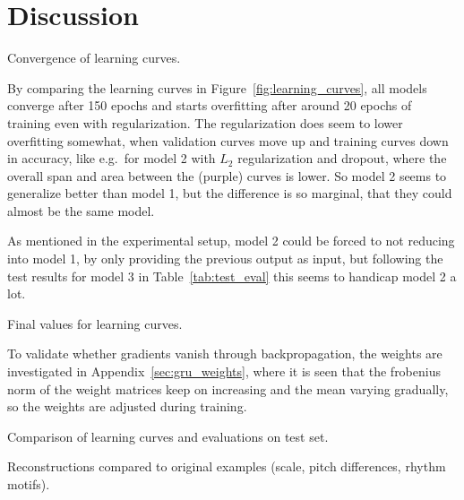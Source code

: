 \section{Discussion}
\label{sec:discussion}

Convergence of learning curves.

By comparing the learning curves in Figure~\ref{fig:learning_curves}, all models converge after 150 epochs and starts overfitting after around 20 epochs of training even with regularization. The regularization does seem to lower overfitting somewhat, when validation curves move up and training curves down in accuracy, like e.g.\ for model 2 with $L_2$ regularization and dropout, where the overall span and area between the (purple) curves is lower. So model 2 seems to generalize better than model 1, but the difference is so marginal, that they could almost be the same model.

As mentioned in the experimental setup, model 2 could be forced to not reducing into model 1, by only providing the previous output as input, but following the test results for model 3 in Table~\ref{tab:test_eval} this seems to handicap model 2 a lot.  

Final values for learning curves.

To validate whether gradients vanish through backpropagation, the weights are investigated in Appendix~\ref{sec:gru_weights}, where it is seen that the frobenius norm of the weight matrices keep on increasing and the mean varying gradually, so the weights are adjusted during training. 

Comparison of learning curves and evaluations on test set.

Reconstructions compared to original examples (scale, pitch differences, rhythm motifs).
